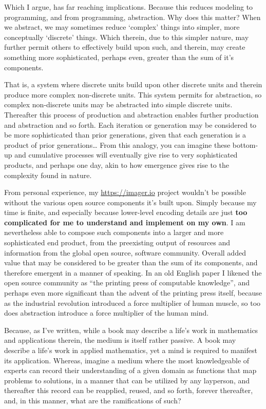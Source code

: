 Which I argue, has far reaching implications. Because this reduces modeling to programming, and from programming, abstraction. Why does this matter? When we abstract, we may sometimes reduce `complex' things into simpler, more conceptually `discrete' things. Which therein, due to this simpler nature, may further permit others to effectively build upon such, and therein, may create something more sophisticated, perhaps even, greater than the sum of it's components.

That is, a system where discrete units build upon other discrete units and therein produce more complex non-discrete units. This system permits for abstraction, so complex non-discrete units may be abstracted into simple discrete units. Thereafter this process of production and abstraction enables further production and abstraction and so forth. Each iteration or generation may be considered to be more sophisticated than prior generations, given that each generation is a product of prior generations… From this analogy, you can imagine these bottom-up and cumulative processes will eventually give rise to very sophisticated products, and perhaps one day, akin to how emergence gives rise to the complexity found in nature.

From personal experience, my \url{https://imager.io} project wouldn’t be possible without the various open source components it’s built upon. Simply because my time is finite, and especially because lower-level encoding details are just \textbf{too complicated for me to understand and implement on my own}. I am nevertheless able to compose such components into a larger and more sophisticated end product, from the preexisting output of resources and information from the global open source, software community. Overall added value that may be considered to be greater than the sum of its components, and therefore emergent in a manner of speaking. In an old English paper I likened the open source community as ``the printing press of computable knowledge'', and perhaps even more significant than the advent of the printing press itself, because as the industrial revolution introduced a force multiplier of human muscle, so too does abstraction introduce a force multiplier of the human mind.

Because, as I've written, while a book may describe a life’s work in mathematics and applications therein, the medium is itself rather passive. A book may describe a life’s work in applied mathematics, yet a mind is required to manifest its application. Whereas, imagine a medium where the most knowledgeable of experts can record their understanding of a given domain as functions that map problems to solutions, in a manner that can be utilized by any layperson, and thereafter this record can be reapplied, reused, and so forth, forever thereafter, and, in this manner, what are the ramifications of such?


